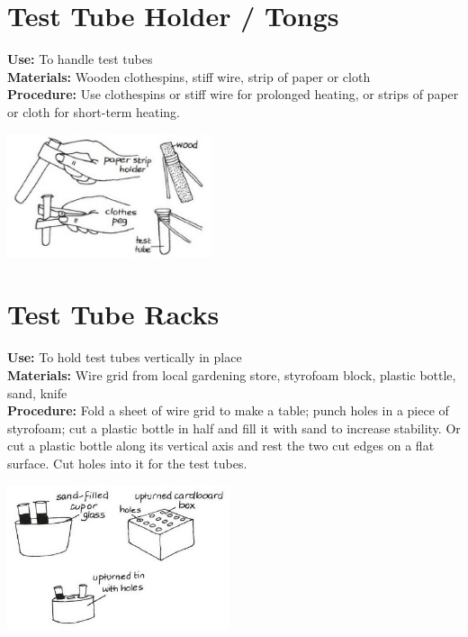 \begin{multicols}{2}
\columnbreak

\section{Test Tube Holder / Tongs} 
\label{sec:test-tube-holder}
\vspace{-10pt}
\textbf{Use:} To handle test tubes\\
\textbf{Materials:} Wooden clothespins, stiff wire, strip of paper or cloth\\
\textbf{Procedure:} Use clothespins or stiff wire for prolonged heating, or strips of paper or cloth for short-term heating.
\begin{center}
\includegraphics[width=0.45\textwidth]{./img/vso/test-tube-holder.jpg}
\end{center}

\section{Test Tube Racks} 
\label{sec:test-tube-racks}
\vspace{-10pt}
\textbf{Use:} To hold test tubes vertically in place\\
\textbf{Materials:} Wire grid from local gardening store, styrofoam block, plastic bottle, sand, knife\\
\textbf{Procedure:} Fold a sheet of wire grid to make a table; punch holes in a piece of styrofoam; cut a plastic bottle in half and fill it with sand to increase stability. Or cut a plastic bottle along its vertical axis and rest the two cut edges on a flat surface. Cut holes into it for the test tubes.
\begin{center}
\includegraphics[width=0.49\textwidth]{./img/vso/test-tube-rack.jpg}
\end{center}


\end{multicols}
